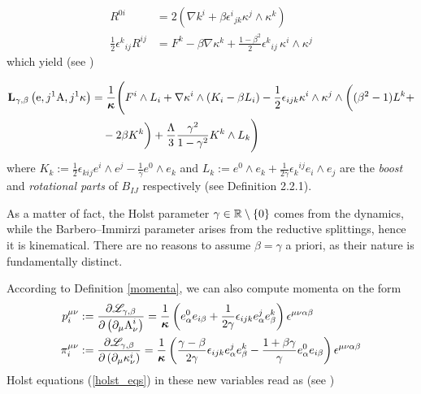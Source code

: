 \begin{align*}
    R^{0i}&=2\left(\nabla k^i+\beta{\epsilon^i}_{jk}\kappa^j\wedge\kappa^k\right)\\
    \frac{1}{2}{\epsilon^k}_{ij}R^{ij}&=F^k-\beta\nabla\kappa^k+\frac{1-\beta^2}{2}{\epsilon^k}_{ij}\,\kappa^i\wedge\kappa^j
\end{align*}
which yield (see \cite{holst})

\begin{align*}
    \mathbf{L}_{\gamma,\beta}\left(\text{\normalfont e},j^1\text{\normalfont A},j^1\kappa\right)&=\frac{1}{\boldsymbol{\kappa}}\Biggl(F^i\wedge L_i+\nabla\kappa^i\wedge(K_i-\beta L_i)-\frac{1}{2}\epsilon_{ijk}\kappa^i\wedge\kappa^j\wedge\bigg((\beta^2-1)L^k+\\
    &\quad-2\beta K^k\bigg)+\frac{\Lambda}{3}\frac{\gamma^2}{1-\gamma^2}K^k\wedge L_k\Biggl)
\end{align*}
where $K_k:=\frac{1}{2}\epsilon_{kij}e^i\wedge e^j-\frac{1}{\gamma}e^0\wedge e_k$ and $L_k:=e^0\wedge e_k+\frac{1}{2\gamma}{\epsilon_k}^{ij}e_i\wedge e_j$ are the \emph{boost} and \emph{rotational parts} of $B_{IJ}$ respectively (see Definition 2.2.1).

As a matter of fact, the Holst parameter $\gamma\in\mathbb{R}\setminus\{0\}$ comes from the dynamics, while the Barbero--Immirzi parameter arises from the reductive splittings, hence it is kinematical. There are no reasons to assume $\beta=\gamma$ a priori, as their nature is fundamentally distinct. 

According to Definition \ref{momenta}, we can also compute momenta on the form
\begin{equation}\label{holst_momenta}
   \begin{split}
       p^{\mu\nu}_i&:=\frac{\partial\mathscr{L}_{\gamma,\beta}}{\partial\left(\partial_\mu\text{\normalfont A}^i_\nu\right)}=\frac{1}{\boldsymbol{\kappa}}\left(e^0_\alpha e_{i\beta}+\frac{1}{2\gamma}\epsilon_{ijk}e^j_\alpha e^k_\beta\right)\epsilon^{\mu\nu\alpha\beta}\\
       \pi^{\mu\nu}_i&:=\frac{\partial\mathscr{L}_{\gamma,\beta}}{\partial\left(\partial_\mu\kappa^i_\nu\right)}=\frac{1}{\boldsymbol{\kappa}}\left(\frac{\gamma-\beta}{2\gamma}\epsilon_{ijk}e^j_\alpha e^k_\beta-\frac{1+\beta\gamma}{\gamma}e^0_\alpha e_{i\beta}\right)\epsilon^{\mu\nu\alpha\beta}
   \end{split} 
\end{equation}
Holst equations (\ref{holst_eqs}) in these new variables read as (see \cite{LN3})


